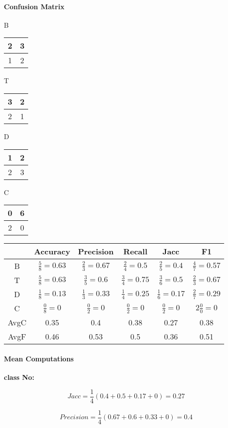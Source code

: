 \documentclass[10pt]{article}
\begin{document}
\paragraph{Confusion Matrix}
\begin{center}
B \begin{tabular}{ c| c }
 2 & 3  \\
 \hline
 1& 2
\end{tabular}
 T \begin{tabular}{ c| c }
 3 & 2  \\
 \hline
 2& 1
\end{tabular}
 D \begin{tabular}{ c| c }
 1 & 2  \\
 \hline
 2& 3
\end{tabular}
 C \begin{tabular}{ c| c }
 0 & 6  \\
 \hline
 2& 0
\end{tabular}

\begin{tabular}{ c|c|c|c|c|c }
 &Accuracy & Precision & Recall&Jacc&F1 \\
 \hline
 B & $\frac{5}{8}= 0.63$ & $\frac{2}{3}=0.67$ & $\frac{2}{4}= 0.5$ & $\frac{2}{5}= 0.4$ & $\frac{4}{7} = 0.57$  \\
  \hline
 T & $\frac{5}{8} = 0.63$ & $\frac{3}{5} = 0.6$ & $\frac{3}{4} = 0.75$ & $\frac{3}{6} = 0.5$ & $\frac{2}{3} = 0.67$\\
  \hline
 D & $\frac{1}{8} = 0.13$ & $\frac{1}{3}= 0.33 $ & $\frac{1}{4}=0.25 $ & $\frac{1}{6} = 0.17$ & $\frac{2}{7}= 0.29$\\
  \hline
 C & $\frac{0}{8} = 0$ & $\frac{0}{2} =0$ & $\frac{0}{2} = 0$ & $\frac{0}{2}=0$ & $2\frac{0}{0} = 0$ \\
 \hline\hline
 AvgC&0.35 &0.4&0.38 &0.27 &0.38 \\
 AvgF&0.46 &0.53 &0.5 &0.36 &0.51

\end{tabular}
\end{center}
\paragraph{Mean Computations\\}

\textbf{class No:}


$$Jacc = \frac{1}{4}\left(0.4+0.5+0.17+0\right)= 0.27$$

$$Precision = \frac{1}{4}\left(0.67+0.6+0.33+0\right)= 0.4$$
\end{document}

